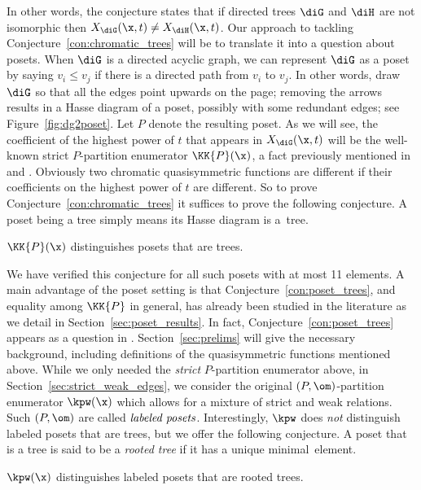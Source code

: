 In other words, the conjecture states that if directed trees
$\diG$ and $\diH$ are not isomorphic then $X_{\diG}(\x, t) \neq X_{\diH}(\x, t)$.  Our approach to tackling Conjecture~\ref{con:chromatic_trees} will be to translate it into a question about posets.  When $\diG$ is a directed acyclic graph, we can represent $\diG$ as a poset  by saying $v_i \leq v_j$ if there is a directed path from $v_i$ to $v_j$.  In other words, draw $\diG$ so that all the edges point upwards on the page; removing the arrows results in a Hasse diagram of a poset, possibly with some redundant edges; see Figure~\ref{fig:dg2poset}.  Let $P$ denote the resulting poset.  As we will see, the coefficient of the highest power of $t$ that appears in $X_{\diG}(\x, t)$ will be the well-known strict $P$-partition enumerator $\KK{P}(\x)$, a fact previously mentioned in \cite[Theorem~7.4]{AlSu21} and \cite[p.~11]{Ell17+}.   Obviously two chromatic quasisymmetric functions are different if their coefficients on the highest power of $t$ are different.  So to prove Conjecture~\ref{con:chromatic_trees} it suffices to prove the following conjecture.  A poset being a tree simply means its Hasse diagram is a~tree.

\begin{conjecture}\label{con:poset_trees}
$\KK{P}(\x)$ distinguishes posets that are trees. 
\end{conjecture}

We have verified this conjecture for all such posets with at most 11 elements.  A main advantage of the poset setting is that Conjecture~\ref{con:poset_trees}, and equality among $\KK{P}$ in general, has already been studied in the literature as we detail in Section~\ref{sec:poset_results}.  In fact, Conjecture~\ref{con:poset_trees} appears as a question in \cite[Problem~6.1]{HaTs17}.  Section~\ref{sec:prelims} will give the necessary background, including definitions of the quasisymmetric functions mentioned above.  While we only needed the  \emph{strict} $P$-partition enumerator above, in Section~\ref{sec:strict_weak_edges}, we consider the original $(P,\om)$-partition enumerator $\kpw(\x)$ which allows for a mixture of strict and weak relations.  Such $(P,\om)$ are called $\emph{labeled posets}$.  Interestingly, $\kpw$ does \emph{not} distinguish labeled posets that are trees, but we offer the following conjecture.  A poset that is a tree is said to be a \emph{rooted tree} if it has a unique minimal~element.

\begin{conjecture}\label{con:labeled_rooted_trees}
$\kpw(\x)$ distinguishes labeled posets that are rooted trees.
\end{conjecture}
 
